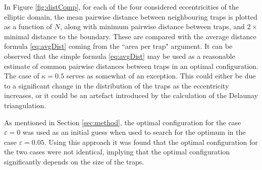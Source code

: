 \documentclass[11pt,letter,subeqn,fleqn]{article}
\def\eps{\varepsilon}
\newcommand{\ecc}{\kappa}
\begin{document}
In Figure \ref{fig:distComp}, for each of the four considered eccentricities of the elliptic domain, the mean pairwise distance between neighbouring traps is plotted as a function of $N$, along with minimum pairwise distance between traps, and $2\times$ minimal distance to the boundary. These are compared with the average distance formula \eqref{eq:avgDist} coming from the ``area per trap" argument. It can be observed that the simple formula \eqref{eq:avgDist} may be used as a reasonable estimate of common pairwise distances between traps in an optimal configuration. The case of $\ecc = 0.5$ serves as somewhat of an exception. This could either be due to a significant change in the distribution of the traps as the eccentricity increases, or it could be an artefact introduced by the calculation of the Delaunay triangulation.

As mentioned in Section \ref{sec:method}, the optimal configuration for the case $\eps = 0$ was used as an initial guess when used to search for the optimum in the case $\eps = 0.05$. Using this approach it was found that the optimal configuration for the two cases were not identical, implying that the optimal configuration significantly depends on the size of the traps.
\end{document}

